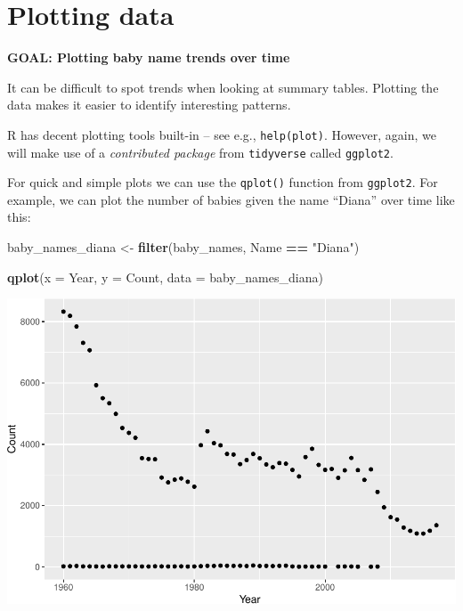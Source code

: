 \documentclass[]{book}
\newenvironment{Shaded}{\begin{snugshade}}{\end{snugshade}}
\newcommand{\DataTypeTok}[1]{\textcolor[rgb]{0.13,0.29,0.53}{#1}}
\newcommand{\KeywordTok}[1]{\textcolor[rgb]{0.13,0.29,0.53}{\textbf{#1}}}
\newcommand{\NormalTok}[1]{#1}
\newcommand{\OperatorTok}[1]{\textcolor[rgb]{0.81,0.36,0.00}{\textbf{#1}}}
\newcommand{\StringTok}[1]{\textcolor[rgb]{0.31,0.60,0.02}{#1}}
\begin{document}
\hypertarget{plotting-data}{%
\section{Plotting data}\label{plotting-data}}

\textbf{GOAL: Plotting baby name trends over time}

It can be difficult to spot trends when looking at summary tables.
Plotting the data makes it easier to identify interesting patterns.

R has decent plotting tools built-in -- see e.g., \texttt{help(plot)}.
However, again, we will make use of a \emph{contributed
package} from \texttt{tidyverse} called \texttt{ggplot2}.

For quick and simple plots we can use the \texttt{qplot()} function from \texttt{ggplot2}. For example,
we can plot the number of babies given the name ``Diana'' over time like this:

\begin{Shaded}
\begin{Highlighting}[]
\NormalTok{baby_names_diana <-}\StringTok{ }\KeywordTok{filter}\NormalTok{(baby_names, Name }\OperatorTok{==}\StringTok{ "Diana"}\NormalTok{)}
\end{Highlighting}
\end{Shaded}

\begin{Shaded}
\begin{Highlighting}[]
\KeywordTok{qplot}\NormalTok{(}\DataTypeTok{x =}\NormalTok{ Year, }\DataTypeTok{y =}\NormalTok{ Count,}
     \DataTypeTok{data =}\NormalTok{ baby_names_diana)}
\end{Highlighting}
\end{Shaded}

\includegraphics{R/Rintro/figures/unnamed-chunk-31-1.pdf}
\end{document}
